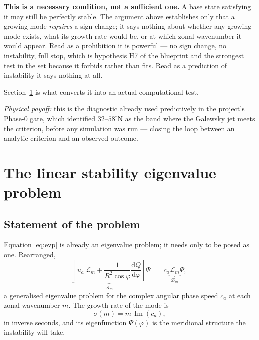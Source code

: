 \documentclass[11pt,a4paper]{article}
\newcommand{\dd}{\mathrm{d}}
\begin{document}
\textbf{This is a necessary condition, not a sufficient one.} A base state
satisfying it may still be perfectly stable. The argument above establishes only
that a growing mode \emph{requires} a sign change; it says nothing about whether
any growing mode exists, what its growth rate would be, or at which zonal
wavenumber it would appear. Read as a prohibition it is powerful --- no sign
change, no instability, full stop, which is hypothesis H7 of the blueprint and
the strongest test in the set because it forbids rather than fits. Read as a
prediction of instability it says nothing at all.

Section~\ref{sec:evp} is what converts it into an actual computational test.

\medskip
\noindent\emph{Physical payoff:} this is the diagnostic already used
predictively in the project's Phase-0 gate, which identified $32$--$58^\circ$N as
the band where the Galewsky jet meets the criterion, before any simulation was
run --- closing the loop between an analytic criterion and an observed outcome.

\section{The linear stability eigenvalue problem}
\label{sec:evp}

\subsection{Statement of the problem}

Equation \eqref{eq:evp} is already an eigenvalue problem; it needs only to be
posed as one. Rearranged,
%
\begin{equation}
\underbrace{\left[\bar u_a\,\mathcal{L}_m
  + \frac{1}{R^2\cos\varphi}\frac{\dd Q}{\dd\varphi}\right]}_{\textstyle \mathcal{A}_m}
  \Psi
\;=\; c_a \underbrace{\mathcal{L}_m}_{\textstyle \mathcal{B}_m}\Psi ,
\label{eq:genevp}
\end{equation}
%
a generalised eigenvalue problem for the complex angular phase speed $c_a$ at
each zonal wavenumber $m$. The growth rate of the mode is
%
\begin{equation}
\sigma(m) = m\,\operatorname{Im}(c_a) ,
\label{eq:growth}
\end{equation}
%
in inverse seconds, and its eigenfunction $\Psi(\varphi)$ is the meridional
structure the instability will take.
\end{document}
